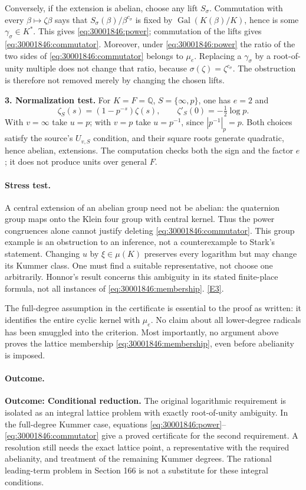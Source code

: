 \documentclass[11pt,a4paper]{article}
\newcommand{\Q}{\mathbb{Q}}
\newcommand{\eref}[2]{\hyperlink{extra:#1:#2}{[E#2]}}
\numberwithin{equation}{section}
\begin{document}
Conversely, if the extension is abelian, choose any lift $S_\sigma$.
Commutation with every $\beta\mapsto\zeta\beta$ says that
$S_\sigma(\beta)/\beta^{c_\sigma}$ is fixed by
$\operatorname{Gal}(K(\beta)/K)$, hence is some
$\gamma_\sigma\in K^*$. This gives \eqref{eq:30001846:power}; commutation
of the lifts gives \eqref{eq:30001846:commutator}. Moreover, under
\eqref{eq:30001846:power} the ratio of the two sides of
\eqref{eq:30001846:commutator} belongs to $\mu_e$. Replacing a
$\gamma_\sigma$ by a root-of-unity multiple does not change that
ratio, because $\sigma(\zeta)=\zeta^{c_\sigma}$. The obstruction is
therefore not removed merely by changing the chosen lifts.

\textbf{3. Normalization test.}
For $K=F=\Q$, $S=\{\infty,p\}$, one has $e=2$ and
\[
 \zeta_S(s)=(1-p^{-s})\zeta(s),\qquad
                  \zeta'_S(0)=-\tfrac12\log p.
\]
With $v=\infty$ take $u=p$; with $v=p$ take $u=p^{-1}$, since
$|p^{-1}|_p=p$. Both choices satisfy the source's $U_{v,S}$ condition,
and their square roots generate quadratic, hence abelian, extensions.
The computation checks both the sign and the factor $e$; it does not
produce units over general $F$.

\paragraph{Stress test.}
A central extension of an abelian group need not be abelian: the quaternion
group maps onto the Klein four group with central kernel. Thus the
power congruences alone cannot justify deleting
\eqref{eq:30001846:commutator}. This group example is an obstruction to an
inference, not a counterexample to Stark's statement. Changing $u$ by
$\xi\in\mu(K)$ preserves every logarithm but may change its Kummer
class. One must find a suitable representative, not choose one
arbitrarily. Honnor's result concerns this ambiguity in its stated
finite-place formula, not all instances of \eqref{eq:30001846:membership}.
\eref{30001846}{3}.

The full-degree assumption in the certificate is essential to the proof
as written: it identifies the entire cyclic kernel with $\mu_e$.
No claim about all lower-degree radicals has been smuggled into the
criterion. Most importantly, no argument above proves the lattice
membership \eqref{eq:30001846:membership}, even before abelianity is imposed.

\paragraph{Outcome.}
\textbf{Outcome: Conditional reduction.}
The original logarithmic requirement is isolated as an integral lattice
problem with exactly root-of-unity ambiguity. In the full-degree Kummer
case, equations \eqref{eq:30001846:power}--\eqref{eq:30001846:commutator} give a
proved certificate for the second requirement. A resolution still needs
the exact lattice point, a representative with the required abelianity,
and treatment of the remaining Kummer degrees. The rational leading-term
problem in Section 166 is not a substitute for these integral conditions.
\end{document}

